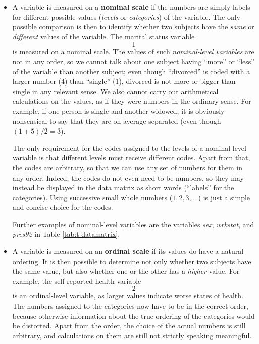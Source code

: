 \documentclass[11pt,a4paper,openany]{book}
\begin{document}
\begin{itemize}
\item
  A variable is measured on a \textbf{nominal scale} if the numbers are
  simply labels for different possible values (\emph{levels} or
  \emph{categories}) of the variable. The only possible comparison is
  then to identify whether two subjects have the \emph{same} or
  \emph{different} values of the variable. The marital status variable
  \[1\] is measured on a nominal scale. The values of such
  \emph{nominal-level variables} are not in any order, so we cannot talk
  about one subject having ``more'' or ``less'' of the variable than
  another subject; even though ``divorced'' is coded with a larger
  number (4) than ``single'' (1), divorced is not more or bigger than
  single in any relevant sense. We also cannot carry out arithmetical
  calculations on the values, as if they were numbers in the ordinary
  sense. For example, if one person is single and another widowed, it is
  obviously nonsensical to say that they are on average separated (even
  though \((1+5)/2=3\)).

  The only requirement for the codes assigned to the levels of a
  nominal-level variable is that different levels must receive different
  codes. Apart from that, the codes are arbitrary, so that we can use
  any set of numbers for them in any order. Indeed, the codes do not
  even need to be numbers, so they may instead be displayed in the data
  matrix as short words (``labels'' for the categories). Using
  successive small whole numbers (\(1,2,3,\dots\)) is just a simple and
  concise choice for the codes.

  Further examples of nominal-level variables are the variables
  \emph{sex}, \emph{wrkstat}, and \emph{pres92} in Table
  \ref{tab:t-datamatrix}.
\item
  A variable is measured on an \textbf{ordinal scale} if its values do
  have a natural ordering. It is then possible to determine not only
  whether two subjects have the same value, but also whether one or the
  other has a \emph{higher} value. For example, the self-reported health
  variable \[2\] is an ordinal-level variable, as larger values indicate
  worse states of health. The numbers assigned to the categories now
  have to be in the correct order, because otherwise information about
  the true ordering of the categories would be distorted. Apart from the
  order, the choice of the actual numbers is still arbitrary, and
  calculations on them are still not strictly speaking meaningful.


\end{itemize}
\end{document}
